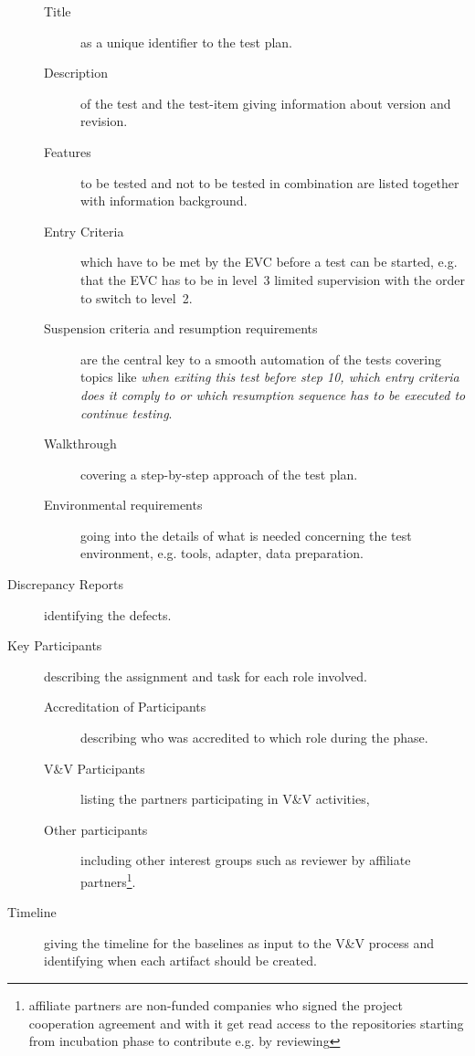 \documentclass{template/openetcs_report}
\begin{document}
\begin{description}
\begin{description} 
\item[Title] as a unique identifier to the test plan.
\item[Description] of the test and the test-item giving information
  about version and revision. 
\item[Features] to be tested and not to be tested in combination are
  listed together with information background.  
\item[Entry Criteria] which have to be met by the EVC before a test
  can be started, e.g. that the EVC has to be in level~3 limited
  supervision with the order to switch to level~2. 
\item[Suspension criteria and resumption requirements] are the central
  key to a smooth automation of the tests covering topics like
  \emph{when exiting this test before step 10, which entry criteria
    does it comply to or which resumption sequence has to be executed
    to continue testing}. 
\item[Walkthrough] covering a step-by-step approach of the test plan.
\item[Environmental requirements] going into the details of what is
  needed concerning the test environment, e.g. tools, adapter, data
  preparation. 
\end{description}

\item[Discrepancy Reports] identifying the defects.
\item[Key Participants] describing the assignment and task for each
  role involved.  

\begin{description}
\item[Accreditation of Participants] describing who was accredited to
  which role during the \VV phase. 
\item[V\&V Participants] listing the partners participating in V\&V activities,
\item[Other participants] including other interest groups such as
  reviewer by affiliate partners\footnote{affiliate partners are
    non-funded companies who signed the project cooperation agreement
    and with it get read access to the repositories starting from
    incubation phase to contribute e.g. by reviewing}. 
\end{description}

\item[Timeline] giving the timeline for the baselines as input to the
  V\&V process and identifying when each artifact should be created. 
\end{description}
\end{document}

